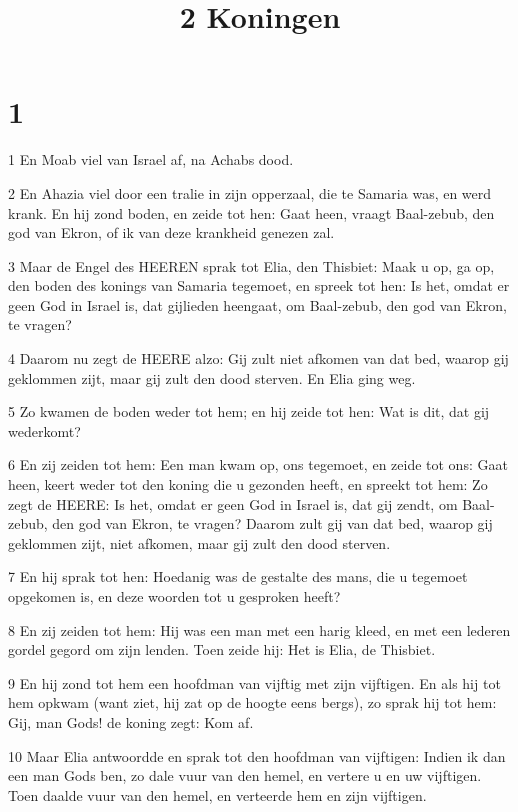 

\title{2 Koningen}



\chapter{1}

\par 1 En Moab viel van Israel af, na Achabs dood.
\par 2 En Ahazia viel door een tralie in zijn opperzaal, die te Samaria was, en werd krank. En hij zond boden, en zeide tot hen: Gaat heen, vraagt Baal-zebub, den god van Ekron, of ik van deze krankheid genezen zal.
\par 3 Maar de Engel des HEEREN sprak tot Elia, den Thisbiet: Maak u op, ga op, den boden des konings van Samaria tegemoet, en spreek tot hen: Is het, omdat er geen God in Israel is, dat gijlieden heengaat, om Baal-zebub, den god van Ekron, te vragen?
\par 4 Daarom nu zegt de HEERE alzo: Gij zult niet afkomen van dat bed, waarop gij geklommen zijt, maar gij zult den dood sterven. En Elia ging weg.
\par 5 Zo kwamen de boden weder tot hem; en hij zeide tot hen: Wat is dit, dat gij wederkomt?
\par 6 En zij zeiden tot hem: Een man kwam op, ons tegemoet, en zeide tot ons: Gaat heen, keert weder tot den koning die u gezonden heeft, en spreekt tot hem: Zo zegt de HEERE: Is het, omdat er geen God in Israel is, dat gij zendt, om Baal-zebub, den god van Ekron, te vragen? Daarom zult gij van dat bed, waarop gij geklommen zijt, niet afkomen, maar gij zult den dood sterven.
\par 7 En hij sprak tot hen: Hoedanig was de gestalte des mans, die u tegemoet opgekomen is, en deze woorden tot u gesproken heeft?
\par 8 En zij zeiden tot hem: Hij was een man met een harig kleed, en met een lederen gordel gegord om zijn lenden. Toen zeide hij: Het is Elia, de Thisbiet.
\par 9 En hij zond tot hem een hoofdman van vijftig met zijn vijftigen. En als hij tot hem opkwam (want ziet, hij zat op de hoogte eens bergs), zo sprak hij tot hem: Gij, man Gods! de koning zegt: Kom af.
\par 10 Maar Elia antwoordde en sprak tot den hoofdman van vijftigen: Indien ik dan een man Gods ben, zo dale vuur van den hemel, en vertere u en uw vijftigen. Toen daalde vuur van den hemel, en verteerde hem en zijn vijftigen.
